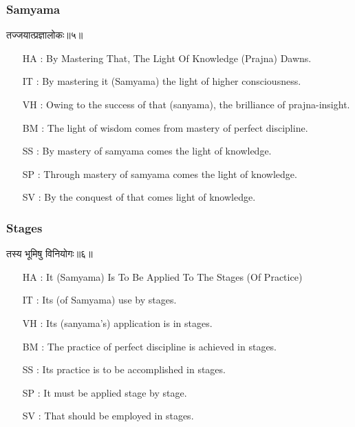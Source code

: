 \begin{frame}[fragile]\frametitle{Samyama}
\begin{sanskrit}
तज्जयात्प्रज्ञालोकः॥५॥
\end{sanskrit}

	\begin{itemize}
	\item [HA]: By Mastering That, The Light Of Knowledge (Prajna) Dawns.
	\item [IT]: By mastering it (Samyama) the light of higher consciousness.
	\item [VH]: Owing to the success of that (sanyama), the brilliance of prajna-insight.
	\item [BM]: The light of wisdom comes from mastery of perfect discipline.
	\item [SS]: By mastery of samyama comes the light of knowledge.
	\item [SP]: Through mastery of samyama comes the light of knowledge.
	\item [SV]: By the conquest of that comes light of knowledge. 
	\end{itemize}
\end{frame}



\begin{frame}[fragile]\frametitle{Stages}
\begin{sanskrit}
तस्य भूमिषु विनियोगः॥६॥
\end{sanskrit}

	\begin{itemize}
	\item [HA]: It (Samyama) Is To Be Applied To The Stages (Of Practice)
	\item [IT]: Its (of Samyama) use by stages.
	\item [VH]: Its (sanyama’s) application is in stages.
	\item [BM]: The practice of perfect discipline is achieved in stages.
	\item [SS]: Its practice is to be accomplished in stages.
	\item [SP]: It must be applied stage by stage.
	\item [SV]: That should be employed in stages. 
	\end{itemize}
\end{frame}


